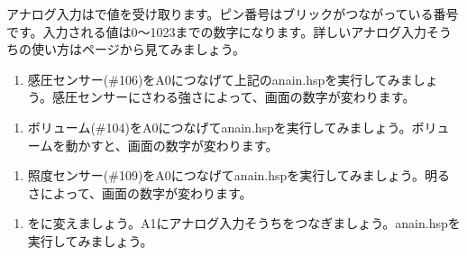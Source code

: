 アナログ入力はで値を受け取ります。ピン番号はブリックがつながっている番号です。入力される値は0～1023までの数字になります。詳しいアナログ入力そうちの使い方は\pageref{analog_in}ページから見てみましょう。\\

\begin{tcolorbox}[title=\useOmetoi]
\begin{enumerate}
\item 感圧センサー(\#106)をA0につなげて上記のanain.hspを実行してみましょう。感圧センサーにさわる強さによって、画面の数字が変わります。
\end{enumerate}
\end{tcolorbox}
\begin{tcolorbox}[title=\useOmetoi]
\begin{enumerate}
\item ボリューム(\#104)をA0につなげてanain.hspを実行してみましょう。ボリュームを動かすと、画面の数字が変わります。
\end{enumerate}
\end{tcolorbox}
\begin{tcolorbox}[title=\useOmetoi]
\begin{enumerate}
\item 照度センサー(\#109)をA0につなげてanain.hspを実行してみましょう。明るさによって、画面の数字が変わります。
\end{enumerate}
\end{tcolorbox}
\begin{tcolorbox}[title=\useOmetoi]
\begin{enumerate}
\item {}をに変えましょう。A1にアナログ入力そうちをつなぎましょう。anain.hspを実行してみましょう。
\end{enumerate}
\end{tcolorbox}